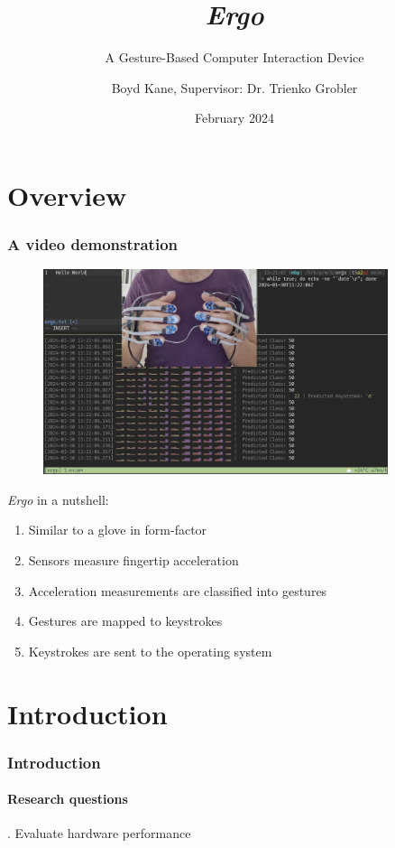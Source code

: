 \documentclass[xcolor={svgnames,table},10pt,fleqn]{beamer}
\title[\emph{Ergo}]{\emph{Ergo}}
\subtitle{A Gesture-Based Computer Interaction Device}
\author{Boyd Kane, Supervisor: Dr. Trienko Grobler}
\institute{Computer Science Division,\\
           Stellenbosch University}
\date{February 2024}
\begin{document}
\begin{frame}
  \maketitle
\end{frame}

\section{Overview}
\begin{frame}
    \frametitle{A video demonstration}
    \begin{figure}[h]
        \centering
        \includegraphics[width=0.9\textwidth]{imgs/video_thumbnail.png}
    \end{figure}
    \emph{Ergo} in a nutshell:
    \begin{enumerate}
        \item Similar to a glove in form-factor
        \item Sensors measure fingertip acceleration
        \item Acceleration measurements are classified into gestures
        \item Gestures are mapped to keystrokes
        \item Keystrokes are sent to the operating system
    \end{enumerate}
\end{frame}

\section{Introduction}
\begin{frame}
    \frametitle{Introduction}
    \framesubtitle{Research questions}
    . Evaluate hardware performance
\end{frame}
\end{document}
